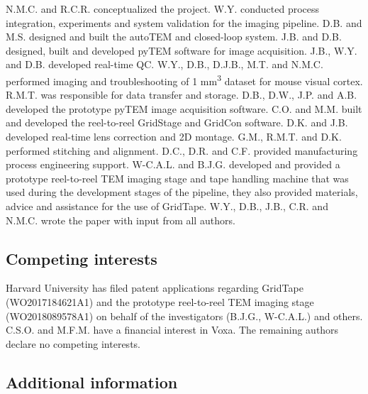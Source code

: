 \documentclass{article}
\begin{document}
{\small N.M.C. and R.C.R. conceptualized the project. W.Y. conducted process integration, experiments and system validation for the imaging pipeline. D.B. and M.S. designed and built the autoTEM and closed-loop system. J.B. and D.B. designed, built and developed pyTEM software for image acquisition. J.B., W.Y. and D.B. developed real-time QC. W.Y., D.B., D.J.B., M.T. and N.M.C. performed imaging and troubleshooting of 1 mm\textsuperscript{3} dataset for mouse visual cortex. R.M.T. was responsible for data transfer and storage. D.B., D.W., J.P. and A.B. developed the prototype pyTEM image acquisition software. C.O. and M.M. built and developed the reel-to-reel GridStage and GridCon software. D.K. and J.B. developed real-time lens correction and 2D montage. G.M., R.M.T. and D.K. performed stitching and alignment. D.C., D.R. and C.F. provided manufacturing process engineering support. W-C.A.L. and B.J.G. developed and provided a prototype reel-to-reel TEM imaging stage and tape handling machine that was used during the development stages of the pipeline, they also provided materials, advice and assistance for the use of GridTape. W.Y., D.B., J.B., C.R. and N.M.C. wrote the paper with input from all authors.}

\subsection*{Competing interests}

{\small Harvard University has filed patent applications regarding GridTape (WO2017184621A1) and the prototype reel-to-reel TEM imaging stage (WO2018089578A1) on behalf of the investigators (B.J.G., W-C.A.L.) and others. C.S.O. and M.F.M. have a financial interest in Voxa. The remaining authors declare no competing interests.}

\subsection*{Additional information}
\end{document}
